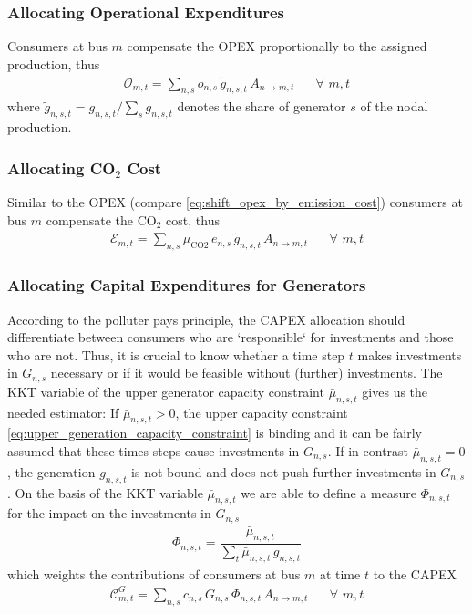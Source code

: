 \documentclass[11pt]{article}
\newcommand{\generation}{g_{n,s,t}}
\newcommand{\capacityGeneration}{G_{n,s}}
\newcommand{\capexGeneration}{c_{n,s}}
\newcommand{\opexGeneration}{o_{n,s}}
\newcommand{\muuppergeneration}{\bar{\mu}_{n,s,t}}
\newcommand{\allocatePeer}{A_{n \rightarrow m,t}}
\newcommand{\allocateCapexGeneration}{\mathcal{C}^{G}_{m,t}}
\newcommand{\allocateOpex}{\mathcal{O}_{m,t}}
\newcommand{\allocateEmissionCost}{\mathcal{E}_{m,t}}
\newcommand{\emission}{e_{n,s}}
\newcommand{\emissionPrice}{\mu_{\text{CO2}}}
\newcommand{\normedgeneration}{\tilde{g}_{n,s,t}}
\newcommand{\impactcapexgeneration}{\Phi_{n,s,t}}
\newcommand{\Forall}[1]{\hspace{20pt} \forall \,\, #1}
\begin{document}
\subsubsection*{Allocating Operational Expenditures}
Consumers at bus $m$ compensate the OPEX proportionally to the assigned production, thus 
\begin{align}
\allocateOpex = \sum_{n,s} \opexGeneration \, \normedgeneration \, \allocatePeer \Forall{m,t} \label{eq:allocate_opexGeneration}
\end{align}
where $\normedgeneration = \generation/\sum_s \generation$ denotes the share of generator $s$ of the nodal production. \\

\subsubsection*{Allocating CO$_2$ Cost}
 Similar to the OPEX (compare \cref{eq:shift_opex_by_emission_cost}) consumers at bus $m$ compensate the CO$_2$ cost, thus 
\begin{align}
 \allocateEmissionCost = \sum_{n,s} \emissionPrice \, \emission \, \normedgeneration \, \allocatePeer \Forall{m,t} \label{eq:allocate_emissionPrice}
\end{align}


\subsubsection*{Allocating Capital Expenditures for Generators}
According to the polluter pays principle, the CAPEX allocation should differentiate between consumers who are `responsible` for investments and those who are not. Thus, it is crucial to know whether a time step $t$ makes investments in $\capacityGeneration$ necessary or if it would be feasible without (further) investments. The KKT variable of the upper generator capacity constraint $\muuppergeneration$ gives us the needed estimator: If $\muuppergeneration > 0$, the upper capacity constraint \cref{eq:upper_generation_capacity_constraint} is binding and it can be fairly assumed that these times steps cause investments in $\capacityGeneration$. If in contrast $\muuppergeneration = 0$, the generation $\generation$ is not bound and does not push further investments in $\capacityGeneration$.
On the basis of the KKT variable $\muuppergeneration$ we are able to define a measure $\impactcapexgeneration$ for the impact on the investments in $\capacityGeneration$  
\begin{align}
    \impactcapexgeneration = \dfrac{\muuppergeneration}{\sum_t \muuppergeneration \, \generation}
\end{align}
which weights the contributions of consumers at bus $m$ at time $t$ to the CAPEX 
\begin{align}
    \allocateCapexGeneration = \sum_{n,s} \capexGeneration \, \capacityGeneration \, \impactcapexgeneration\, \allocatePeer \Forall{m,t} \label{eq:allocate_capexGeneration}
\end{align}
\end{document}
